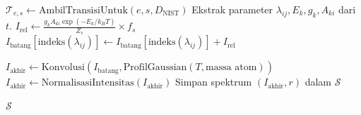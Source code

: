 \begin{onehalfspace}
\begin{algorithm}[H]
\begin{algorithmic}[1]
                \STATE $\mathcal{T}_{e,s} \gets \text{AmbilTransisiUntuk}(e, s, D_{\text{NIST}})$
                    \STATE {}
                    \STATE Ekstrak parameter $\lambda_{ij}, E_k, g_k, A_{ki}$ dari $t$.
                    \STATE $I_{\text{rel}} \gets \frac{g_k A_{ki} \exp(-E_k / k_B T)}{Z_s} \times f_s$
                    \STATE $I_{\text{batang}}[\text{indeks}(\lambda_{ij})] \gets I_{\text{batang}}[\text{indeks}(\lambda_{ij})] + I_{\text{rel}}$
                \ENDFOR
            \ENDFOR
        \ENDFOR
        
        \STATE {}
        \STATE $I_{\text{akhir}} \gets \text{Konvolusi}(I_{\text{batang}}, \text{ProfilGaussian}(T, \text{massa atom}))$
        \STATE $I_{\text{akhir}} \gets \text{NormalisasiIntensitas}(I_{\text{akhir}})$ 
        \STATE Simpan spektrum $(I_{\text{akhir}}, r)$ dalam $\mathcal{S}$
    \ENDFOR
    
    \STATE \RETURN $\mathcal{S}$
\end{algorithmic}
\end{algorithm}



\end{onehalfspace}
